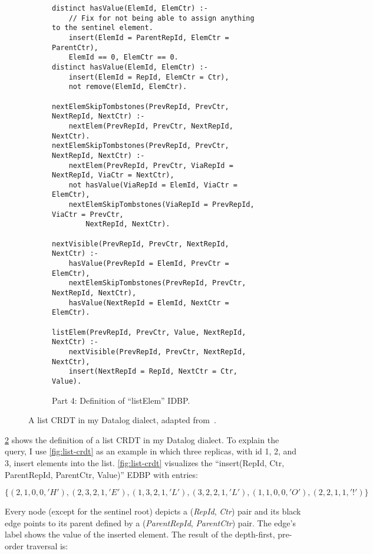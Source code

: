 \begin{figure}[htpb]\ContinuedFloat
    \centering

    \begin{subfigure}[b]{\textwidth}
        \begin{lstlisting}[keepspaces,escapechar=!]
distinct hasValue(ElemId, ElemCtr) :-
    // Fix for not being able to assign anything to the sentinel element.
    insert(ElemId = ParentRepId, ElemCtr = ParentCtr),
    ElemId == 0, ElemCtr == 0.
distinct hasValue(ElemId, ElemCtr) :-
    insert(ElemId = RepId, ElemCtr = Ctr),
    not remove(ElemId, ElemCtr).

nextElemSkipTombstones(PrevRepId, PrevCtr, NextRepId, NextCtr) :-
    nextElem(PrevRepId, PrevCtr, NextRepId, NextCtr).
nextElemSkipTombstones(PrevRepId, PrevCtr, NextRepId, NextCtr) :-
    nextElem(PrevRepId, PrevCtr, ViaRepId = NextRepId, ViaCtr = NextCtr),
    not hasValue(ViaRepId = ElemId, ViaCtr = ElemCtr),
    nextElemSkipTombstones(ViaRepId = PrevRepId, ViaCtr = PrevCtr,
        NextRepId, NextCtr).

nextVisible(PrevRepId, PrevCtr, NextRepId, NextCtr) :-
    hasValue(PrevRepId = ElemId, PrevCtr = ElemCtr),
    nextElemSkipTombstones(PrevRepId, PrevCtr, NextRepId, NextCtr),
    hasValue(NextRepId = ElemId, NextCtr = ElemCtr).

listElem(PrevRepId, PrevCtr, Value, NextRepId, NextCtr) :-
    nextVisible(PrevRepId, PrevCtr, NextRepId, NextCtr),
    insert(NextRepId = RepId, NextCtr = Ctr, Value).\end{lstlisting}
        \caption{Part 4: Definition of ``listElem'' \ac{IDBP}.}\label{code:list-crdt-datalog-dialect-part4}
    \end{subfigure}
    \caption{A list \ac{CRDT} in my Datalog dialect, adapted from~\cite{kleppmann2018data}.}\label{code:list-crdt-datalog-dialect}
\end{figure}



\ref{code:list-crdt-datalog-dialect} shows the definition of a list \ac{CRDT}
in my Datalog dialect.
To explain the query, I use \ref{fig:list-crdt} as an example in which
three replicas, with id 1, 2, and 3, insert elements into the list.
\ref{fig:list-crdt} visualizes the
``insert(RepId, Ctr, ParentRepId, ParentCtr, Value)'' \ac{EDBP} with entries:

\[\{ (2,1,0,0,'H'), (2,3,2,1,'E'), (1,3,2,1,'L'), (3,2,2,1,'L'), (1,1,0,0,'O'), (2,2,1,1,'!') \}\]

Every node (except for the sentinel root) depicts a (\textit{RepId}, \textit{Ctr})
pair and its black edge points to its parent defined by
a (\textit{ParentRepId}, \textit{ParentCtr}) pair.
The edge's label shows the value of the inserted element.
The result of the depth-first, pre-order traversal is:

